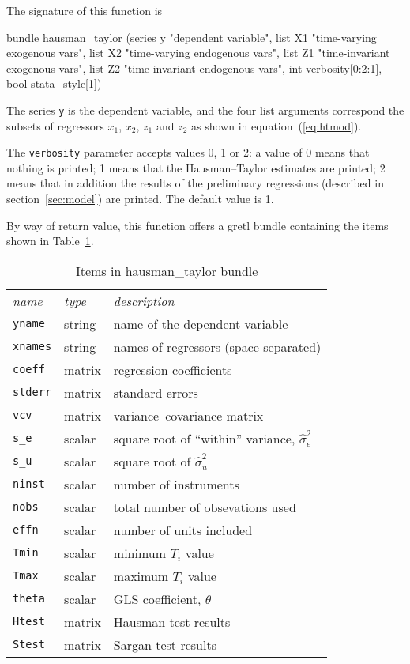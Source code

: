 \documentclass{article}
\begin{document}
The signature of this function is
%
\begin{code}
bundle hausman_taylor (series y "dependent variable", 
                       list X1 "time-varying exogenous vars",
                       list X2 "time-varying endogenous vars", 
                       list Z1 "time-invariant exogenous vars",
                       list Z2 "time-invariant endogenous vars",
                       int verbosity[0:2:1],
                       bool stata_style[1])
\end{code}

The series \texttt{y} is the dependent variable, and the four list
arguments correspond the subsets of regressors $x_1$, $x_2$, $z_1$ and
$z_2$ as shown in equation~(\ref{eq:htmod}).

The \texttt{verbosity} parameter accepts values 0, 1 or 2: a value of
0 means that nothing is printed; 1 means that the Hausman--Taylor
estimates are printed; 2 means that in addition the results of the
preliminary regressions (described in section~\ref{sec:model}) are
printed. The default value is 1.

By way of return value, this function offers a gretl bundle containing
the items shown in Table~\ref{tab:bun}.

\begin{table}[htbp]
\centering
\begin{tabular}{llp{}}
  \textit{name}   & \textit{type} & \textit{description} \\[4pt]
  \texttt{yname} & string & name of the dependent variable \\
  \texttt{xnames} & string & names of regressors (space separated) \\
  \texttt{coeff} & matrix & regression coefficients \\
  \texttt{stderr} & matrix & standard errors \\
  \texttt{vcv} & matrix & variance--covariance matrix \\
  \texttt{s\_e} & scalar & square root of ``within'' variance, 
    $\hat{\sigma}^2_{\epsilon}$ \\
  \texttt{s\_u} & scalar & square root of $\hat{\sigma}^2_{u}$ \\
  \texttt{ninst} & scalar & number of instruments \\
  \texttt{nobs} & scalar & total number of obsevations used \\
  \texttt{effn} & scalar & number of units included \\
  \texttt{Tmin} & scalar & minimum $T_i$ value \\
  \texttt{Tmax} & scalar & maximum $T_i$ value \\
  \texttt{theta} & scalar & GLS coefficient, $\theta$ \\
  \texttt{Htest} & matrix & Hausman test results \\
  \texttt{Stest} & matrix & Sargan test results \\
\end{tabular}
\caption{Items in hausman\_taylor bundle}
\label{tab:bun}
\end{table}
\end{document}
